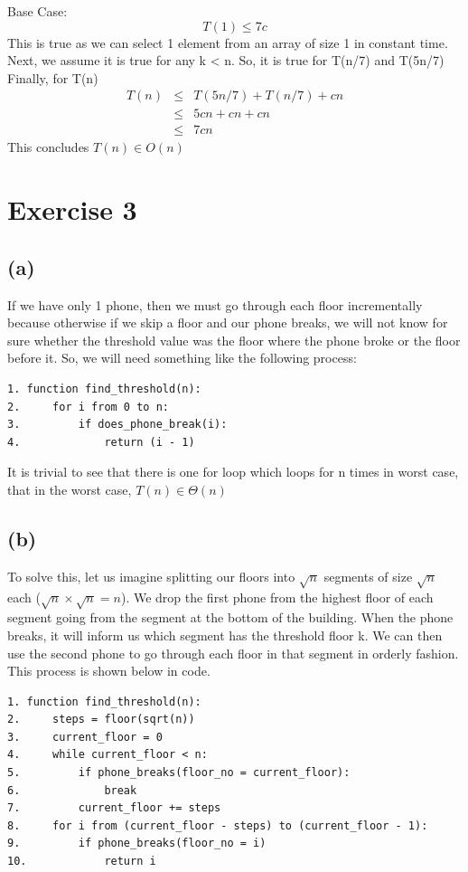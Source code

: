 \documentclass[a4paper,12pt]{article} %
\begin{document}
Base Case:\\
\begin{equation*}
    T(1) \leq 7c
\end{equation*}
This is true as we can select 1 element from an array of size 1 in constant time.\\

Next, we assume it is true for any k < n. So, it is true for T(n/7) and T(5n/7)\\

Finally, for T(n)
\begin{eqnarray*}
    T(n) &\leq& T(5n/7) + T(n/7) + cn\\
    &\leq& 5cn + cn + cn \\
    &\leq& 7cn
\end{eqnarray*}
This concludes $T(n) \in O(n)$


\section*{Exercise 3}
\subsection*{(a)}

If we have only 1 phone, then we must go through each floor incrementally because otherwise if we skip a floor and our phone breaks, we will not know for sure whether the threshold value was the floor where the phone broke or the floor before it. So, we will need something like the following process:
\begin{verbatim}
1. function find_threshold(n):
2.     for i from 0 to n:
3.         if does_phone_break(i):
4.             return (i - 1)
\end{verbatim}
It is trivial to see that there is one for loop which loops for n times in worst case, that in the worst case, $T(n) \in \Theta (n)$

\subsection*{(b)}
To solve this, let us imagine splitting our floors into $\sqrt{n}$ segments of size $\sqrt{n}$ each ($\sqrt{n}\times \sqrt{n} = n$). We drop the first phone from the highest floor of each segment going from the segment at the bottom of the building. When the phone breaks, it will inform us which segment has the threshold floor k. We can then use the second phone to go through each floor in that segment in orderly fashion. This process is shown below in code.
\begin{verbatim}
1. function find_threshold(n):
2.     steps = floor(sqrt(n))
3.     current_floor = 0
4.     while current_floor < n:
5.         if phone_breaks(floor_no = current_floor):
6.             break
7.         current_floor += steps
8.     for i from (current_floor - steps) to (current_floor - 1):
9.         if phone_breaks(floor_no = i)
10.            return i
\end{verbatim}
\end{document}
